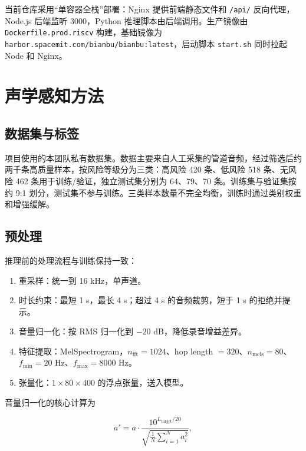 \documentclass[UTF8,11pt,a4paper,fontset=none]{ctexart}
\begin{document}
当前仓库采用“单容器全栈”部署：Nginx 提供前端静态文件和 \texttt{/api/} 反向代理，Node.js 后端监听 3000，Python 推理脚本由后端调用。生产镜像由 \texttt{Dockerfile.prod.riscv} 构建，基础镜像为 \texttt{harbor.spacemit.com/bianbu/bianbu:latest}，启动脚本 \texttt{start.sh} 同时拉起 Node 和 Nginx。

\section{声学感知方法}
\label{sec:acoustic}

\subsection{数据集与标签}

项目使用的本团队私有数据集。数据主要来自人工采集的管道音频，经过筛选后约两千条高质量样本，按风险等级分为三类：高风险 420 条、低风险 518 条、无风险 462 条用于训练/验证，独立测试集分别为 64、79、70 条。训练集与验证集按约 9:1 划分，测试集不参与训练。三类样本数量不完全均衡，训练时通过类别权重和增强缓解。

\subsection{预处理}

推理前的处理流程与训练保持一致：

\begin{enumerate}
  \item 重采样：统一到 16 kHz，单声道。
  \item 时长约束：最短 1 s，最长 4 s；超过 4 s 的音频裁剪，短于 1 s 的拒绝并提示。
  \item 音量归一化：按 RMS 归一化到 \(-20\) dB，降低录音增益差异。
  \item 特征提取：MelSpectrogram，\(n_{\text{fft}}=1024\)、hop length \(=320\)、\(n_{\text{mels}}=80\)、\(f_{\min}=20\) Hz、\(f_{\max}=8000\) Hz。
  \item 张量化：\(1\times80\times400\) 的浮点张量，送入模型。
\end{enumerate}

音量归一化的核心计算为

\begin{equation}
  a' = a \cdot \frac{10^{L_{\text{target}}/20}}
  {\sqrt{\frac{1}{N}\sum_{i=1}^{N}a_i^2}},
  \label{eq:normalize}
\end{equation}
\end{document}
